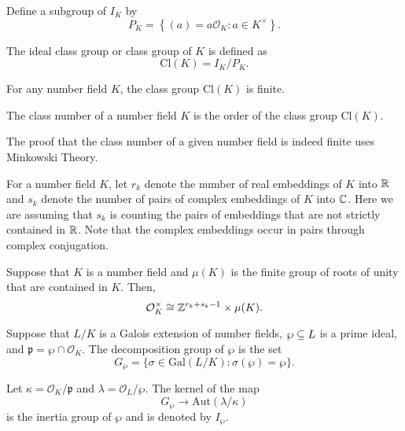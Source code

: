 Define a subgroup of $I_K$ by
    \[P_K = \left\{ (a) = a \mathcal{O}_{K}: a \in K^\times \right\}.\]

\begin{definition}
    The ideal class group or class group of $K$ is defined as 
        \[\textrm{Cl}(K) = I_K/P_K.\]
\end{definition}

\begin{theorem}
    For any number field $K$, the class group $\textrm{Cl}(K)$ is finite.
\end{theorem}

\begin{definition}
    The class number of a number field $K$ is the order of the class group $\textrm{Cl}(K)$.
\end{definition}

The proof that the class number of a given number field is indeed finite uses Minkowski Theory.

For a number field $K$, let $r_k$ denote the number of real embeddings of $K$ into $\mathbb{R}$ and $s_k$ denote the number of pairs of complex embeddings of $K$ into $\mathbb{C}$. Here we are assuming that $s_k$ is counting the pairs of embeddings that are not strictly contained in $\mathbb{R}$. Note that the complex embeddings occur in pairs through complex conjugation.

\begin{theorem}
    Suppose that $K$ is a number field and $\mu(K)$ is the finite group of roots of unity that are contained in $K$. Then,
        \[\mathcal{O}_{K}^\times \cong \mathbb{Z}^{r_k + s_k -1} \times \mu(K).\]
\end{theorem}

\begin{definition}
    Suppose that $L/K$ is a Galois extension of number fields, $\wp \subseteq L$ is a prime ideal, and $\mathfrak{p} = \wp \cap \mathcal{O}_{K}$. The decomposition group of $\wp$ is the set 
        \[G_\wp = \{\sigma \in \textrm{Gal}(L/K): \sigma(\wp) = \wp\}.\]
\end{definition}


\begin{definition}
    Let $\kappa = \mathcal{O}_{K}/\mathfrak{p}$ and $\lambda = \mathcal{O}_{L}/\wp$. The kernel of the map
        \[G_\wp \to \textrm{Aut}(\lambda/\kappa)\]
    is the inertia group of $\wp$ and is denoted by $I_\wp$. 
\end{definition}

